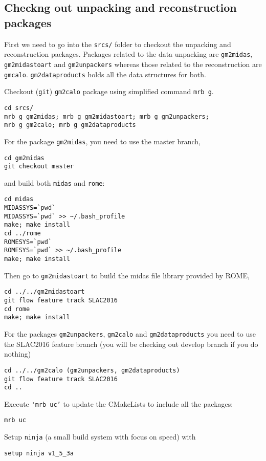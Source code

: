 \subsection{Checkng out unpacking and reconstruction packages}
First we need to go into the \verb+srcs/+ folder to checkout the unpacking and reconstruction packages. 
Packages related to the data unpacking are \verb+gm2midas+, \verb+gm2midastoart+ and \verb+gm2unpackers+ whereas those related to the reconstruction are
\verb+gmcalo+. \verb+gm2dataproducts+ holds all the data structures for both.

Checkout (\verb+git+) \verb+gm2calo+ package using simplified command \verb+mrb g+.
%
\begin{Verbatim}[frame=single]
cd srcs/
mrb g gm2midas; mrb g gm2midastoart; mrb g gm2unpackers;
mrb g gm2calo; mrb g gm2dataproducts
\end{Verbatim}
%
For the package \verb+gm2midas+, you need to use the master branch,
%
\begin{Verbatim}[frame=single]
cd gm2midas
git checkout master
\end{Verbatim}
%
and build both \verb+midas+ and \verb+rome+:
%
\begin{Verbatim}[frame=single]
cd midas
MIDASSYS=`pwd`
MIDASSYS=`pwd` >> ~/.bash_profile
make; make install
cd ../rome
ROMESYS=`pwd`
ROMESYS=`pwd` >> ~/.bash_profile
make; make install
\end{Verbatim}
%
Then go to \verb+gm2midastoart+ to build the midas file library provided by ROME,
%
\begin{Verbatim}[frame=single]
cd ../../gm2midastoart
git flow feature track SLAC2016
cd rome
make; make install
\end{Verbatim}
%
For the packages \verb+gm2unpackers+, \verb+gm2calo+ and \verb+gm2dataproducts+
you need to use the SLAC2016 feature branch (you will be checking out develop branch if you do nothing)
%
\begin{Verbatim}[frame=single]
cd ../../gm2calo (gm2unpackers, gm2dataproducts)
git flow feature track SLAC2016
cd ..
\end{Verbatim}
%
Execute \verb+'mrb uc’+ to update the CMakeLists to include all the packages:
%
\begin{Verbatim}[frame=single]
mrb uc
\end{Verbatim}
%
Setup \verb+ninja+ (a small build system with focus on speed) with
%
\begin{Verbatim}[frame=single]
setup ninja v1_5_3a
\end{Verbatim}
